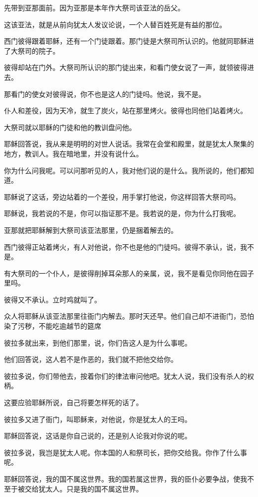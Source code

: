 \documentclass[12pt,oneside]{book}
\begin{document}
先带到亚那面前。因为亚那是本年作大祭司该亚法的岳父。

这该亚法，就是从前向犹太人发议论说，一个人替百姓死是有益的那位。

西门彼得跟着耶稣，还有一个门徒跟着。那门徒是大祭司所认识的。他就同耶稣进了大祭司的院子。

彼得却站在门外。大祭司所认识的那门徒出来，和看门使女说了一声，就领彼得进去。

那看门的使女对彼得说，你不也是这人的门徒吗。他说，我不是。

仆人和差役，因为天冷，就生了炭火，站在那里烤火。彼得也同他们站着烤火。

大祭司就以耶稣的门徒和他的教训盘问他。

耶稣回答说，我从来是明明的对世人说话。我常在会堂和殿里，就是犹太人聚集的地方，教训人。我在暗地里，并没有说什么。

你为什么问我呢。可以问那听见的人，我对他们说的是什么。我所说的，他们都知道。

耶稣说了这话，旁边站着的一个差役，用手掌打他说，你这样回答大祭司吗。

耶稣说，我若说的不是，你可以指证那不是。我若说的是，你为什么打我呢。

亚那就把耶稣解到大祭司该亚法那里，仍是捆着解去的。

西门彼得正站着烤火，有人对他说，你不也是他的门徒吗。彼得不承认，说，我不是。

有大祭司的一个仆人，是彼得削掉耳朵那人的亲属，说，我不是看见你同他在园子里吗。

彼得又不承认。立时鸡就叫了。

众人将耶稣从该亚法那里往衙门内解去。那时天还早。他们自己却不进衙门，恐怕染了污秽，不能吃逾越节的筵席

彼拉多就出来，到他们那里，说，你们告这人是为什么事呢。

他们回答说，这人若不是作恶的，我们就不把他交给你。

彼拉多说，你们带他去，按着你们的律法审问他吧。犹太人说，我们没有杀人的权柄。

这要应验耶稣所说，自己将要怎样死的话了。

彼拉多又进了衙门，叫耶稣来，对他说，你是犹太人的王吗。

耶稣回答说，这话是你自己说的，还是别人论我对你说的呢。

彼拉多说，我岂是犹太人呢。你本国的人和祭司长，把你交给我。你作了什么事呢。

耶稣回答说，我的国不属这世界。我的国若属这世界，我的臣仆必要争战，使我不至于被交给犹太人。只是我的国不属这世界。
\end{document}

